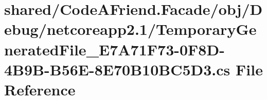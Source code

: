 \hypertarget{shared_2_code_a_friend_8_facade_2obj_2_debug_2netcoreapp2_81_2_temporary_generated_file___e7_a714f104111277015c3d4bec0747ade59b7}{}\section{shared/\+Code\+A\+Friend.Facade/obj/\+Debug/netcoreapp2.1/\+Temporary\+Generated\+File\+\_\+\+E7\+A71\+F73-\/0\+F8\+D-\/4\+B9\+B-\/\+B56\+E-\/8\+E70\+B10\+B\+C5\+D3.cs File Reference}
\label{shared_2_code_a_friend_8_facade_2obj_2_debug_2netcoreapp2_81_2_temporary_generated_file___e7_a714f104111277015c3d4bec0747ade59b7}
